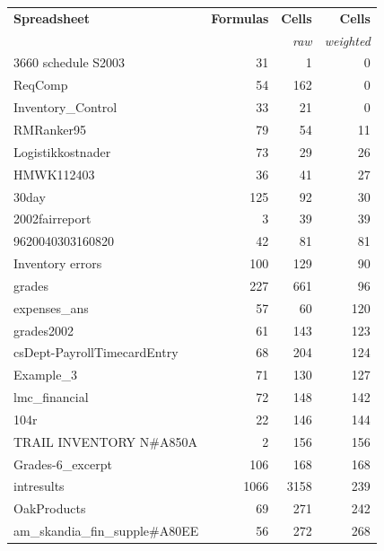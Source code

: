 \begin{table}[t!]
  \centering \begin{tabular}{l|rrr} \bf{Spreadsheet}
    & \textsf{\bf{Formulas}} & {\bf{Cells}} & {\bf{Cells}} \\ & &
    {\small{\it{raw}}} & {\small{\it{weighted}}} \\ \hline
\small{3660 schedule S2003} & \small{31} & \small{1} & \small{0} \\ 
\small{ReqComp} & \small{54} & \small{162} & \small{0} \\ 
\small{Inventory\_Control} & \small{33} & \small{21} & \small{0} \\ 
\small{RMRanker95} & \small{79} & \small{54} & \small{11} \\ 
\small{Logistikkostnader} & \small{73} & \small{29} & \small{26} \\ 
\small{HMWK112403} & \small{36} & \small{41} & \small{27} \\ 
\small{30day} & \small{125} & \small{92} & \small{30} \\ 
\small{2002fairreport} & \small{3} & \small{39} & \small{39} \\ 
\small{9620040303160820} & \small{42} & \small{81} & \small{81} \\ 
\small{Inventory errors} & \small{100} & \small{129} & \small{90} \\ 
\small{grades} & \small{227} & \small{661} & \small{96} \\ 
\small{expenses\_ans} & \small{57} & \small{60} & \small{120} \\ 
\small{grades2002} & \small{61} & \small{143} & \small{123} \\ 
\small{csDept-PayrollTimecardEntry} & \small{68} & \small{204} & \small{124} \\ 
\small{Example\_3} & \small{71} & \small{130} & \small{127} \\ 
\small{lmc\_financial} & \small{72} & \small{148} & \small{142} \\ 
\small{104r} & \small{22} & \small{146} & \small{144} \\ 
\small{TRAIL INVENTORY N\#A850A} & \small{2} & \small{156} & \small{156} \\ 
\small{Grades-6\_excerpt} & \small{106} & \small{168} & \small{168} \\ 
\small{intresults} & \small{1066} & \small{3158} & \small{239} \\ 
\small{OakProducts} & \small{69} & \small{271} & \small{242} \\ 
\small{am\_skandia\_fin\_supple\#A80EE} & \small{56} & \small{272} & \small{268} \\ 

\end{tabular}
\end{table}
